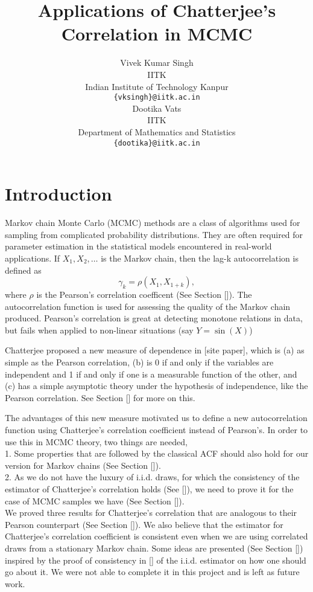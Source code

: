 \documentclass{article}
\title{Applications of Chatterjee's Correlation in MCMC
}
\author{
  Vivek Kumar Singh \\
  IITK \\
  Indian Institute of Technology Kanpur \\
  \texttt{\{vksingh\}@iitk.ac.in} \\
   \And
  Dootika Vats \\
 IITK \\
 Department of Mathematics and Statistics \\
 \texttt{\{dootika\}@iitk.ac.in}
}
\begin{document}
\maketitle

\section{Introduction}

	Markov chain Monte Carlo (MCMC) methods are a class of algorithms used for sampling from complicated probability distributions.
	They are often required for parameter estimation in the statistical models encountered in real-world applications.
	If $X_1, X_2, \dots$ is the Markov chain,
	then the lag-k autocorrelation is defined as
	$$\gamma_k = \rho(X_1, X_{1+k}),$$
	where $\rho$ is the Pearson's correlation coefficent (See Section []).
	The autocorrelation function is used for assessing the quality of the Markov chain produced.
	Pearson's correlation is great at detecting monotone relations in data,
	but fails when applied to non-linear situations (say $Y = \sin(X)$)

	Chatterjee proposed a new measure of dependence in [site paper], which is
	(a) as simple as the Pearson correlation,
	(b) is 0 if and only if the variables are independent and 1 if and only if one is a measurable function of the other, and
	(c) has a simple asymptotic theory under the hypothesis of independence, like the Pearson correlation.
	See Section [] for more on this.

	The advantages of this new measure motivated us to define a new autocorrelation function using Chatterjee's correlation coefficient instead of Pearson's.
	In order to use this in MCMC theory, two things are needed,\\
	1. Some properties that are followed by the classical ACF should also hold for our version for Markov chains (See Section []).\\
	2. As we do not have the luxury of i.i.d. draws, for which the consistency of the estimator of Chatterjee's correlation holds (See []),
		we need to prove it for the case of MCMC samples we have (See Section []).\\
	We proved three results for Chatterjee's correlation that are analogous to their Pearson counterpart (See Section []).
	We also believe that the estimator for Chatterjee's correlation coefficient is consistent even when we are using correlated draws from a stationary Markov chain.
	Some ideas are presented (See Section []) inspired by the proof of consistency in [] of the i.i.d. estimator on how one should go about it.
	We were not able to complete it in this project and is left as future work.
\end{document}

